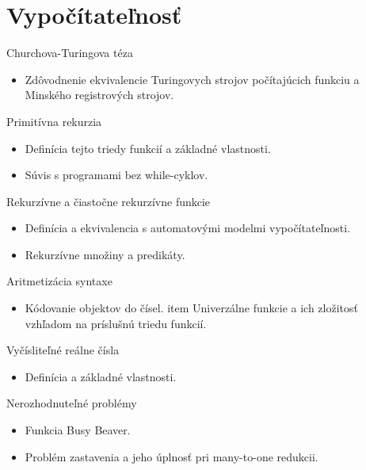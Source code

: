 \documentclass[a4paper]{report}
\begin{document}
\chapter{Vypočítateľnosť}

\begin{zadanie}{Churchova-Turingova téza}
\begin{itemize}
 \item Zdôvodnenie ekvivalencie Turingovych strojov počítajúcich funkciu a Minského registrových strojov.
\end{itemize}
\end{zadanie}

\begin{zadanie}{Primitívna rekurzia}
\begin{itemize}
 \item Definícia tejto triedy funkcií a základné vlastnosti.
 \item Súvis s programami bez while-cyklov.
\end{itemize}
\end{zadanie}

\begin{zadanie}{Rekurzívne a čiastočne rekurzívne funkcie}
\begin{itemize}
 \item Definícia a ekvivalencia s automatovými modelmi vypočítateľnosti.
 \item Rekurzívne množiny a predikáty.
\end{itemize}
\end{zadanie}

\begin{zadanie}{Aritmetizácia syntaxe}
\begin{itemize}
 \item Kódovanie objektov do čísel.
 item Univerzálne funkcie a ich zložitosť vzhľadom na príslušnú triedu funkcií.
\end{itemize}
\end{zadanie}

\begin{zadanie}{Vyčísliteľné reálne čísla}
\begin{itemize}
 \item Definícia a základné vlastnosti.
\end{itemize}
\end{zadanie}

\begin{zadanie}{Nerozhodnuteľné problémy}
\begin{itemize}
 \item Funkcia Busy Beaver.
 \item Problém zastavenia a jeho úplnosť pri many-to-one redukcii.
\end{itemize}
\end{zadanie}
\end{document}
